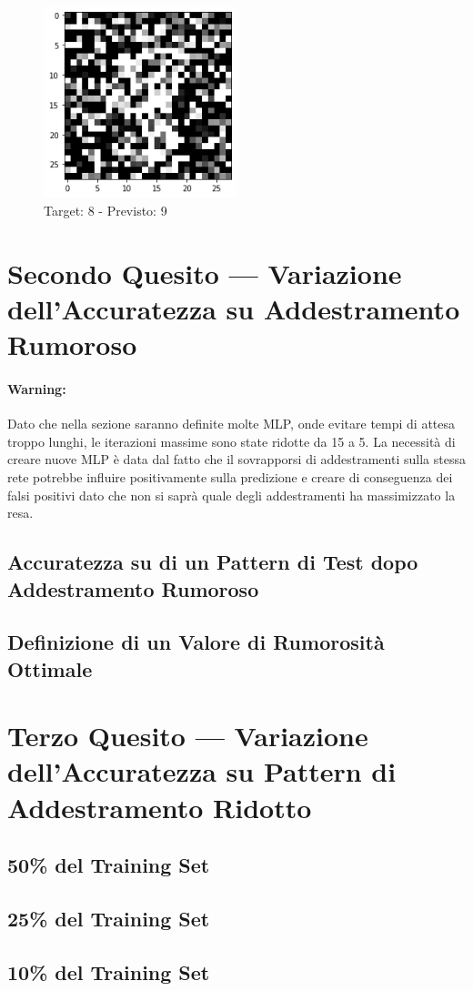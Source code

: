 \documentclass[12pt, a4paper]{article}
\begin{document}
\begin{figure}[H]
    \centering
    \caption{Target: 8 - Previsto: 9}
    \includegraphics[width=0.5\textwidth]{ErrConv5.png}
\end{figure}

\newpage
\section{Secondo Quesito --- Variazione dell'Accuratezza su Addestramento Rumoroso}
\paragraph{Warning:} Dato che nella sezione saranno definite molte MLP, onde evitare tempi di attesa troppo lunghi, le iterazioni massime sono state ridotte da 15 a 5. La necessità di creare nuove MLP è data dal fatto che il sovrapporsi di addestramenti sulla stessa rete potrebbe influire positivamente sulla predizione e creare di conseguenza dei falsi positivi dato che non si saprà quale degli addestramenti ha massimizzato la resa.

\subsection{Accuratezza su di un Pattern di Test dopo Addestramento Rumoroso}
\subsection{Definizione di un Valore di Rumorosità Ottimale}

\newpage
\section{Terzo Quesito --- Variazione dell'Accuratezza su Pattern di Addestramento Ridotto}
\subsection{50\% del Training Set}
\subsection{25\% del Training Set}
\subsection{10\% del Training Set}
\end{document}

